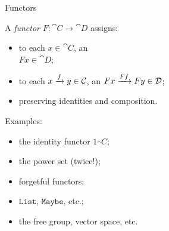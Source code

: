 \documentclass{beamer}
\newlength{\wideitemsep}
\let\olditem\item
\renewcommand{\item}{\setlength{\itemsep}{\wideitemsep}\olditem}
\begin{document}


\begin{frame}{Functors}
  \begin{minipage}{.45\textwidth}
  A \emph{functor} $F:\cat{C}\to\cat{D}$ assigns:
  \begin{itemize}
    \item to each $x\in\cat{C}$, an\\$Fx\in\cat{D}$;
    \item to each $x\xrightarrow{f} y\in{\mathcal{C}}$, an $Fx\xrightarrow{Ff} Fy\in{\mathcal{D}}$;
    \item preserving identities and composition.
  \end{itemize}
  \end{minipage}
  \hfill\pause
  \begin{minipage}{.5\textwidth}
    Examples:\pause
    \begin{itemize}
      \item the identity functor $1_\cat{C}$;\pause
      \item the power set (twice!);\pause
      \item forgetful functors;\pause
      \item $\texttt{List}$, $\texttt{Maybe}$, etc.;\pause
      \item the free group, vector space, etc.
    \end{itemize}
  \end{minipage}
\end{frame}
\end{document}
